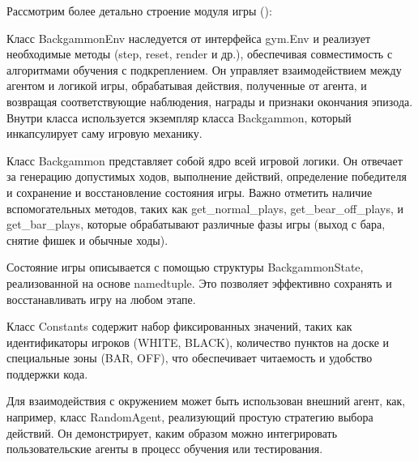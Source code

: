Рассмотрим более детально строение модуля игры ():


Класс BackgammonEnv наследуется от интерфейса gym.Env и реализует необходимые методы (step, reset, render и др.), обеспечивая совместимость с алгоритмами обучения с подкреплением. Он управляет взаимодействием между агентом и логикой игры, обрабатывая действия, полученные от агента, и возвращая соответствующие наблюдения, награды и признаки окончания эпизода. Внутри класса используется экземпляр класса Backgammon, который инкапсулирует саму игровую механику.

Класс Backgammon представляет собой ядро всей игровой логики. Он отвечает за генерацию допустимых ходов, выполнение действий, определение победителя и сохранение и восстановление состояния игры. Важно отметить наличие вспомогательных методов, таких как get\_normal\_plays, get\_bear\_off\_plays, и get\_bar\_plays, которые обрабатывают различные фазы игры (выход с бара, снятие фишек и обычные ходы).

Состояние игры описывается с помощью структуры BackgammonState, реализованной на основе namedtuple. Это позволяет эффективно сохранять и восстанавливать игру на любом этапе.

Класс Constants содержит набор фиксированных значений, таких как идентификаторы игроков (WHITE, BLACK), количество пунктов на доске и специальные зоны (BAR, OFF), что обеспечивает читаемость и удобство поддержки кода.

Для взаимодействия с окружением может быть использован внешний агент, как, например, класс RandomAgent, реализующий простую стратегию выбора действий. Он демонстрирует, каким образом можно интегрировать пользовательские агенты в процесс обучения или тестирования.
